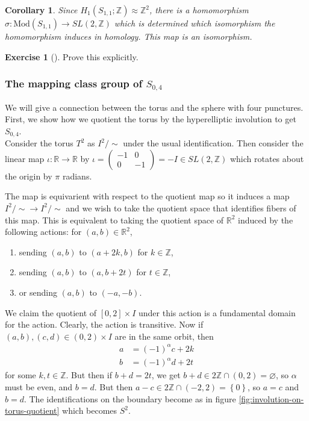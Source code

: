 \documentclass[reqno]{amsart}
\newtheorem{corollary}[theorem]{Corollary}
\theoremstyle{definition}
\newtheorem{exercise}[theorem]{Exercise}
\theoremstyle{remark}
\newcommand{\Mod}{{\mathrm{Mod}}}
\begin{document}
\begin{corollary}
    Since $H_1 \left( S_{1,1}; \mathbb{Z} \right) \approx
    \mathbb{Z}^2$, there is a homomorphism
    $\sigma \colon \Mod \left( S_{1,1} \right) \to 
    SL(2, \mathbb{Z})$ which is determined
    which isomorphism the homomorphism induces in
    homology. This map is an isomorphism.
\end{corollary}

\begin{exercise}[]
    Prove this explicitly.
\end{exercise}

\subsubsection*{The mapping class group of
$S_{0,4}$}

We will give a connection between the torus and the
sphere with four punctures. First, we show
how we quotient the torus by the hyperelliptic involution to
get $S_{0,4}$.\\


Consider the torus $T^2$ as $I^2 / \sim$ under the usual
identification. Then consider the
linear map $\iota \colon \mathbb{R} \to \mathbb{R}$ 
by
$\iota = \begin{pmatrix} -1 & 0\\ 0 & -1 \end{pmatrix} 
= - I
\in SL(2, \mathbb{Z})$ which rotates about the origin
by $\pi$ radians.

The map is equivarient with respect to the quotient map
so it induces a map $I^2 / \sim \to I^2 / \sim$
and we wish to take the quotient space that identifies
fibers of this map. This is equivalent to taking
the quotient space of $\mathbb{R}^2$ induced by the
following actions: for $\left( a,b \right) \in \mathbb{R}^2$,
\begin{enumerate}
    \item sending $(a,b)$ to $(a+2k,b)$ for $k \in \mathbb{Z}$,
    \item sending $(a,b)$ to $(a, b+ 2t)$ for $t \in \mathbb{Z}$,
    \item or sending $(a,b)$ to $(-a, -b)$.
\end{enumerate}
We claim the quotient of $\left[ 0,2 \right] \times I $ 
under this action
is a fundamental domain for the action.
Clearly, the action is transitive. Now
if $(a,b),(c,d) \in (0,2) \times I $ are in the same orbit,
then
\begin{align*}
    a &= (-1)^{\alpha} c + 2k \\
    b &= (-1)^{\alpha} d + 2t
\end{align*}
for some $k,t \in \mathbb{Z}$. But then
if $b+d = 2t$, we  get $b+d \in 2 \mathbb{Z} \cap \left( 0,2 \right) 
= \varnothing$, so $\alpha$ must be even, and
$b = d$. But then
$a-c \in  2\mathbb{Z} \cap \left( -2, 2 \right) =
\left\{ 0 \right\} $, so $a=c$ and $b=d$.
The identifications on the boundary become as in figure
\ref{fig:involution-on-torus-quotient} which becomes
$S^2$.
\end{document}
